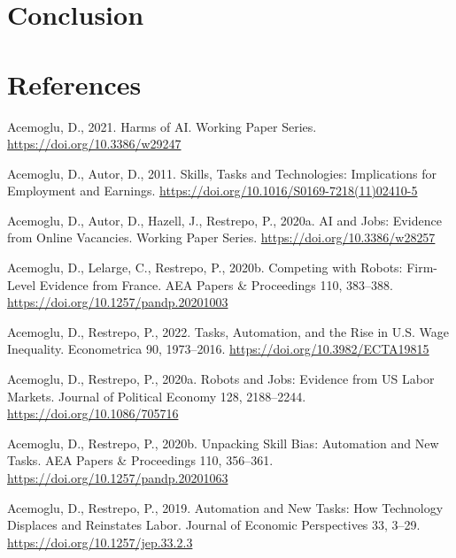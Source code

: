 \documentclass[
  12pt,
  a4paperpaper,
]{article}
\newlength{\cslhangindent}
\newenvironment{CSLReferences}[2] %
 {\begin{list}{}{%
  \setlength{\itemindent}{0pt}
  \setlength{\leftmargin}{0pt}
  \setlength{\parsep}{0pt}
  \ifodd #1
   \setlength{\leftmargin}{\cslhangindent}
   \setlength{\itemindent}{-1\cslhangindent}
  \fi
  \setlength{\itemsep}{#2\baselineskip}}}
 {\end{list}}
\begin{document}
\section{Conclusion}\label{sec-conclusion}

\newpage{}

\section*{References}\label{sec-references}

\label{refs}
\begin{CSLReferences}{1}{0}
Acemoglu, D., 2021. Harms of {AI}. Working {Paper} {Series}.
\url{https://doi.org/10.3386/w29247}

Acemoglu, D., Autor, D., 2011. Skills, {Tasks} and {Technologies}:
{Implications} for {Employment} and {Earnings}.
\url{https://doi.org/10.1016/S0169-7218(11)02410-5}

Acemoglu, D., Autor, D., Hazell, J., Restrepo, P., 2020a. {AI} and
{Jobs}: {Evidence} from {Online} {Vacancies}. Working {Paper} {Series}.
\url{https://doi.org/10.3386/w28257}

Acemoglu, D., Lelarge, C., Restrepo, P., 2020b. Competing with {Robots}:
{Firm}-{Level} {Evidence} from {France}. AEA Papers \& Proceedings 110,
383--388. \url{https://doi.org/10.1257/pandp.20201003}

Acemoglu, D., Restrepo, P., 2022. Tasks, {Automation}, and the {Rise} in
{U}.{S}. {Wage} {Inequality}. Econometrica 90, 1973--2016.
\url{https://doi.org/10.3982/ECTA19815}

Acemoglu, D., Restrepo, P., 2020a. Robots and {Jobs}: {Evidence} from
{US} {Labor} {Markets}. Journal of Political Economy 128, 2188--2244.
\url{https://doi.org/10.1086/705716}

Acemoglu, D., Restrepo, P., 2020b. Unpacking {Skill} {Bias}:
{Automation} and {New} {Tasks}. AEA Papers \& Proceedings 110, 356--361.
\url{https://doi.org/10.1257/pandp.20201063}

Acemoglu, D., Restrepo, P., 2019. Automation and {New} {Tasks}: {How}
{Technology} {Displaces} and {Reinstates} {Labor}. Journal of Economic
Perspectives 33, 3--29. \url{https://doi.org/10.1257/jep.33.2.3}


\end{CSLReferences}
\end{document}
